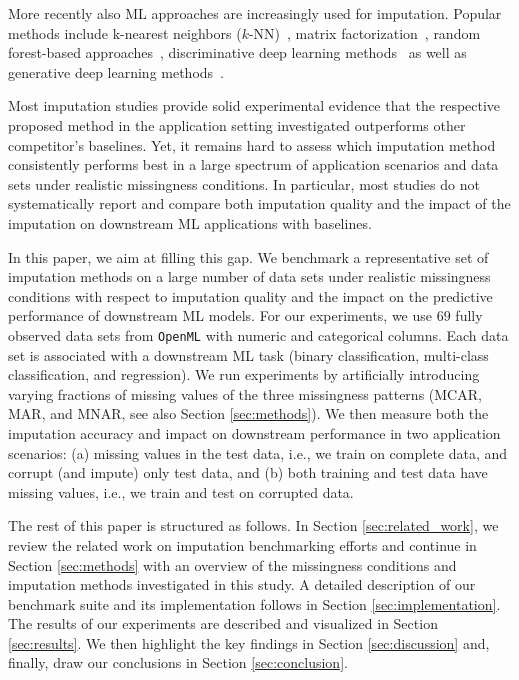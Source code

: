 \documentclass[utf8]{frontiersSCNS} %
\newcommand{\code}[1]{\texttt{#1}}
\begin{document}
More recently also ML approaches are increasingly used for imputation. Popular methods include k-nearest neighbors ($k$-NN)~\citep{Batista2003}, matrix factorization~\citep{Troyanskaya2001,Koren2009,Mazumder2010}, random forest-based approaches~\citep{Stekhoven2012}, discriminative deep learning methods~\citep{Biessmann2018a} as well as generative deep learning methods~\citep{GAIN, HIVAE, VAE_for_genomic_data, MisGAN, VIGAN}.

Most imputation studies provide solid experimental evidence that the respective proposed method in the application setting investigated outperforms other competitor's baselines. Yet, it remains hard to assess which imputation method consistently performs best in a large spectrum of application scenarios and data sets under realistic missingness conditions. In particular, most studies do not systematically report and compare both imputation quality and the impact of the imputation on downstream ML applications with baselines.

In this paper, we aim at filling this gap. We benchmark a representative set of imputation methods on a large number of data sets under realistic missingness conditions with respect to imputation quality and the impact on the predictive performance of downstream ML models. For our experiments, we use $69$ fully observed data sets from \code{OpenML} \citep{OpenML2013} with numeric and categorical columns. Each data set is associated with a downstream ML task (binary classification, multi-class classification, and regression). We run experiments by artificially introducing varying fractions of missing values of the three missingness patterns (MCAR, MAR, and MNAR, see also Section \ref{sec:methods}). We then measure both the imputation accuracy and impact on downstream performance in two application scenarios: (a) missing values in the test data, i.e., we train on complete data, and corrupt (and impute) only test data, and (b) both training and test data have missing values, i.e., we train and test on corrupted data.

The rest of this paper is structured as follows. In Section \ref{sec:related_work}, we review the related work on imputation benchmarking efforts and continue in Section \ref{sec:methods} with an overview of the missingness conditions and imputation methods investigated in this study. A detailed description of our benchmark suite and its implementation follows in Section \ref{sec:implementation}. The results of our experiments are described and visualized in Section \ref{sec:results}. We then highlight the key findings in Section \ref{sec:discussion} and, finally, draw our conclusions in Section \ref{sec:conclusion}.
\end{document}
